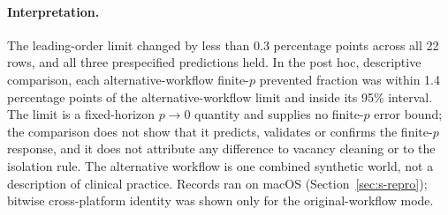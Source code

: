 \paragraph{Interpretation.} The
leading-order limit changed by less than 0.3 percentage points across all 22
rows, and all three prespecified predictions held. In the post hoc, descriptive
comparison, each alternative-workflow finite-$p$ prevented fraction was
within 1.4 percentage points of the alternative-workflow limit and inside its
95\% interval. The limit is a fixed-horizon $p\to0$ quantity and supplies no
finite-$p$ error bound; the comparison does not show that it predicts, validates
or confirms the finite-$p$ response, and it does not attribute any difference to
vacancy cleaning or to the isolation rule. The alternative workflow is one
combined synthetic world, not a description of clinical practice. Records ran on
macOS (Section~\ref{sec:s-repro}); bitwise cross-platform identity was shown only
for the original-workflow mode.

